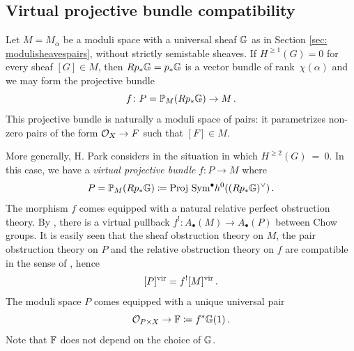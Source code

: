 \documentclass[a4paper, 12pt]{amsart}
\begin{document}

\subsection{Virtual projective bundle compatibility}
\label{sec: virtualprojectivebundle}

Let $M=M_\alpha$ be a moduli space with a universal sheaf ${\mathbb{G}}$ as in Section \ref{sec: modulisheavespairs}, without strictly semistable sheaves. If $H^{\geq 1}(G)=0$ for every sheaf $[G]\in M$, then $Rp_\ast {\mathbb{G}}=p_\ast {\mathbb{G}}$ is a vector bundle of rank~$\chi(\alpha)$ and we may form the projective bundle
\[f\colon P={\mathbb{P}}_M(Rp_\ast {\mathbb{G}})\to M\,.\]
This projective bundle is naturally a moduli space of pairs: it parametrizes non-zero pairs of the form ${\mathcal O}_X\to F$ such that $[F]\in M$. 

More generally, H. Park considers in \cite[Section 4]{park} the situation in which $H^{\geq 2}(G)~=~0$. In this case, we have a \textit{virtual projective bundle} $f\colon P\to M$
where 
\[P={\mathbb{P}}_M(Rp_\ast{\mathbb{G}})\coloneqq \textup{Proj Sym}^\bullet h^0((Rp_\ast {\mathbb{G}})^\vee)\,.\]
The morphism $f$ comes equipped with a natural relative perfect obstruction theory. By \cite{manolache}, there is a virtual pullback $f^!\colon A_\bullet(M)\to A_\bullet(P)$ between Chow groups. It is easily seen that the sheaf obstruction theory on $M$, the pair obstruction theory on $P$ and the relative obstruction theory on $f$ are compatible in the sense of \cite[Corollary 4.9]{manolache}, hence
\[[P]^{\mathrm{vir}}=f^![M]^{\mathrm{vir}}\,.\]
The moduli space $P$ comes equipped with a unique universal pair
\[{\mathcal O}_{P\times X}\to {\mathbb{F}}\coloneqq f^\ast{\mathbb{G}}(1)\,.\]
Note that ${\mathbb{F}}$ does not depend on the choice of ${\mathbb{G}}$.
\end{document}
